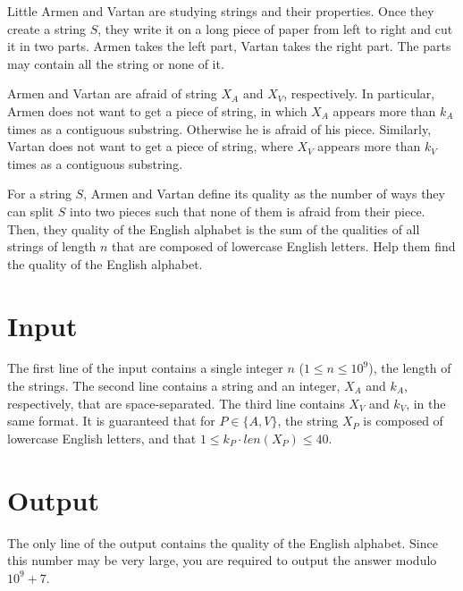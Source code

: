 
Little Armen and Vartan are studying strings and their properties.
Once they create a string $S$, they write it on a long piece of paper from left to right and cut it in two parts.
Armen takes the left part, Vartan takes the right part.
The parts may contain all the string or none of it.

Armen and Vartan are afraid of string $X_A$ and $X_V$, respectively.
In particular, Armen does not want to get a piece of string, in which $X_A$ appears more than $k_A$ times as a contiguous substring.
Otherwise he is afraid of his piece.
Similarly, Vartan does not want to get a piece of string, where $X_V$ appears more than $k_V$ times as a contiguous substring.

For a string $S$, Armen and Vartan define its quality as the number of ways they can split $S$ into two pieces such that none of them is afraid from their piece.
Then, they quality of the English alphabet is the sum of the qualities of all strings of length $n$ that are composed of lowercase English letters.
Help them find the quality of the English alphabet.

\section*{Input}
The first line of the input contains a single integer $n$ ($1 \leq n \leq 10^9$), the length of the strings.
The second line contains a string and an integer, $X_A$ and $k_A$, respectively, that are space-separated.
The third line contains $X_V$ and $k_V$, in the same format.
It is guaranteed that for $P \in \{ A, V \}$, the string $X_P$ is composed of lowercase English letters, and that $1 \leq k_P \cdot len(X_P) \leq 40$.

\section*{Output}
The only line of the output contains the quality of the English alphabet.
Since this number may be very large, you are required to output the answer modulo $10^9 + 7$.
